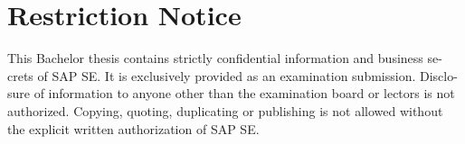 \chapter*{Restriction Notice}

This Bachelor thesis contains strictly confidential information and business se- crets of SAP SE. It is exclusively provided as an examination submission. Disclo- sure of information to anyone other than the examination board or lectors is not authorized. Copying, quoting, duplicating or publishing is not allowed without the explicit written authorization of SAP SE.
